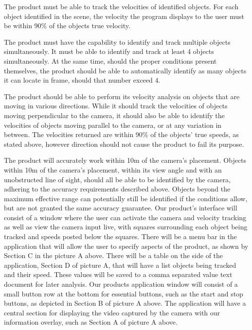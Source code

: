 \documentclass[onecolumn, draftclsnofoot,10pt, compsoc]{IEEEtran}
\begin{document}
The product must be able to track the velocities of identified objects.
For each object identified in the scene, the velocity the program displays to the user must be within 90\% of the objects true velocity.

The product must have the capability to identify and track multiple objects simultaneously.
It must be able to identify and track at least 4 objects simultaneously.
At the same time, should the proper conditions present themselves, the product should be able to automatically identify as many objects it can locate in frame, should that number exceed 4.

The product should be able to perform its velocity analysis on objects that are moving in various directions.
While it should track the velocities of objects moving perpendicular to the camera, it should also be able to identify the velocities of objects moving parallel to the camera, or at any variation in between.
The velocities returned are within 90\% of the objects' true speeds, as stated above, however direction should not cause the product to fail its purpose.

The product will accurately work within 10m of the camera's placement.
Objects within 10m of the camera's placement, within its view angle and with an unobstructed line of sight, should all be able to be identified by the camera, adhering to the accuracy requirements described above.
Objects beyond the maximum effective range can potentially still be identified if the conditions allow, but are not granted the same accuracy guarantee.
Our product's interface will consist of a window where the user can activate the camera and velocity tracking as well as view the camera input live, with squares surrounding each object being tracked and speeds posted below the squares.
There will be a menu bar in the application that will allow the user to specify aspects of the product, as shown by Section C in the picture A above.
There will be a table on the side of the application, Section D of picture A, that will have a list objects being tracked and their speed.
These values will be saved to a comma separated value text document for later analysis.
Our products application window will consist of a small button row at the bottom for essential buttons, such as the start and stop buttons, as depicted in Section B of picture A above.
The application will have a central section for displaying the video captured by the camera with our information overlay, such as Section A of picture A above.
\end{document}

